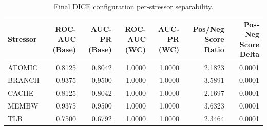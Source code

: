 \begin{table}[t]
\centering
\caption{Final DICE configuration per-stressor separability.}
\label{tab:dice_full_stressor}
\footnotesize
\begin{tabular}{lrrrrrr}
\toprule
Stressor & ROC-AUC (Base) & AUC-PR (Base) & ROC-AUC (WC) & AUC-PR (WC) & Pos/Neg Score Ratio & Pos-Neg Score Delta \\
\midrule
ATOMIC & 0.8125 & 0.8042 & 1.0000 & 1.0000 & 2.1823 & 0.0001 \\
BRANCH & 0.9375 & 0.9500 & 1.0000 & 1.0000 & 3.5891 & 0.0001 \\
CACHE & 0.8125 & 0.8042 & 1.0000 & 1.0000 & 2.1697 & 0.0001 \\
MEMBW & 0.9375 & 0.9500 & 1.0000 & 1.0000 & 3.6323 & 0.0001 \\
TLB & 0.7500 & 0.6792 & 1.0000 & 1.0000 & 2.3464 & 0.0001 \\
\bottomrule
\end{tabular}

\end{table}
